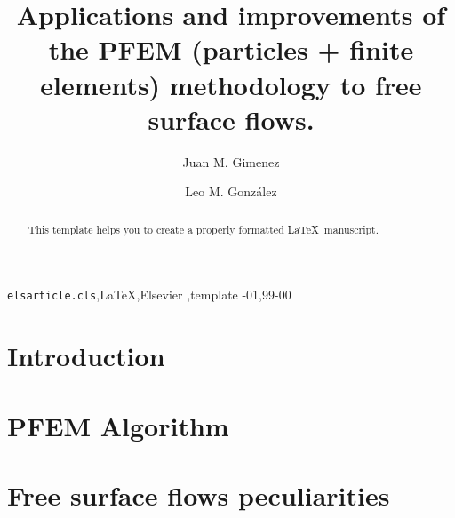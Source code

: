 \documentclass[review]{elsarticle}
\begin{document}
\begin{frontmatter}

\title{Applications and improvements of the PFEM (particles + finite elements) methodology to free surface flows.}

\author{Juan M. Gimenez}
\address{CIMEC, Santa Fe, Argentina}
\author{Leo M. Gonz\'{a}lez}
\address{UPM, Madrid, Spain}

%
%
%

\begin{abstract}
This template helps you to create a properly formatted \LaTeX\ manuscript.
\end{abstract}

\begin{keyword}
\texttt{elsarticle.cls}\sep \LaTeX\sep Elsevier \sep template
-01\sep  99-00
\end{keyword}

\end{frontmatter}

\linenumbers


\section{Introduction}\label{Intro}



\section{PFEM Algorithm}\label{PFEM_Algorithm}


\section{Free surface flows peculiarities}\label{Free_surface}



% 
\end{document}
